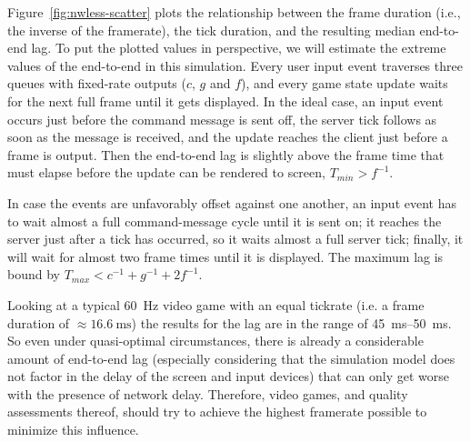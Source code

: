 Figure~\ref{fig:nwless-scatter} plots the relationship between the frame duration (i.e., the inverse of the framerate), the tick duration, and the resulting median end-to-end lag.
%
%
To put the plotted values in perspective, we will estimate the extreme 
values of the end-to-end in this simulation. Every user input 
event traverses three queues with fixed-rate outputs ($c$, $g$ and $f$), 
and every game state update waits for the next full frame until it gets 
displayed. In the ideal case, an input event occurs just before the command 
message is sent off, the server tick follows as soon as the message is 
received, and the update reaches the client just before a frame is output. 
Then the end-to-end lag is slightly above the frame time that must elapse 
before the update can be rendered to screen, $T_{min}>f^{-1}$.

In case the events are unfavorably offset against one 
another, an input event has to wait almost a full command-message cycle 
until it is sent on; it reaches the server just after a tick has 
occurred, so it waits almost a full server tick; finally, it will wait 
for almost two frame times until it is displayed. The maximum lag is 
bound by $T_{max}<c^{-1}+g^{-1}+2f^{-1}$.

Looking at a typical \SI{60}{\hertz} video game with an equal tickrate (i.e. a frame duration of $\approx \SI{16.6}{\milli\second}$) the results for the lag are in the range of \SIrange{45}{50}{\milli\second}. So even under quasi-optimal circumstances, there is already a considerable amount of end-to-end lag (especially considering that the simulation model does not factor in the delay of the screen and input devices) that can only get worse with the presence of network delay. Therefore, video games, and quality assessments thereof, should try to achieve the highest framerate possible to minimize this influence.

